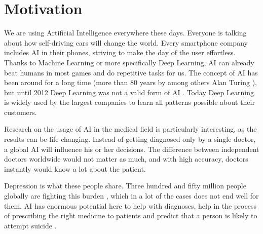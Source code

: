 
\section{Motivation}
%
%
%

We are using Artificial Intelligence everywhere these days. Everyone is talking about how self-driving cars will change the world. Every smartphone company includes AI in their phones, striving to make the day of the user effortless. Thanks to Machine Learning or more specifically Deep Learning, AI can already beat humans in most games and do repetitive tasks for us. The concept of AI has been around for a long time (more than 80 years by among others Alan Turing \cite{turing1938}), but until 2012 Deep Learning was not a valid form of AI \cite{topol2019}. Today Deep Learning is widely used by the largest companies to learn all patterns possible about their customers. 

Research on the usage of AI in the medical field is particularly interesting, as the results can be life-changing. Instead of getting diagnosed only by a single doctor, a global AI will influence his or her decisions. The difference between independent doctors worldwide would not matter as much, and with high accuracy, doctors instantly would know a lot about the patient. 


Depression is what these people share. Three hundred and fifty million people globally are fighting this burden \cite{burden_of_depression}, which in a lot of the cases does not end well for them. AI has enormous potential here to help with diagnoses, help in the process of prescribing the right medicine to patients and predict that a person is likely to attempt suicide \cite{topol2019}. 